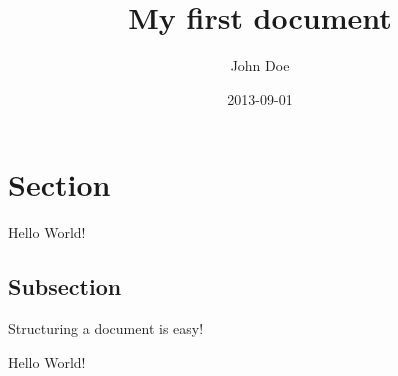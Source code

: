 \documentclass[10pt]{article}
\title{My first document}
\date{2013-09-01}
\author{John Doe}
\begin{document}
  \maketitle
  \newpage
  
  \section{Section}
  Hello World!
  \subsection{Subsection}
  Structuring a document is easy!

   Hello World!
\end{document}

